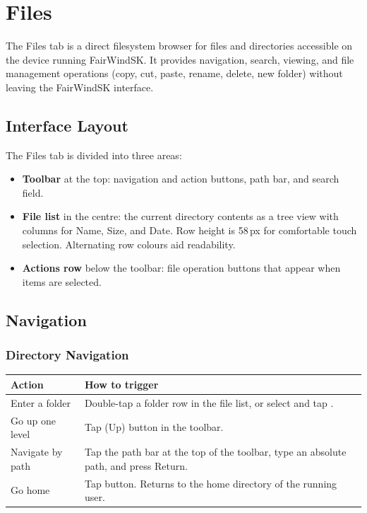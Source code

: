 \chapter{Files}
\label{ch:files}

The Files tab is a direct filesystem browser for files and directories accessible on the device
running FairWindSK.
It provides navigation, search, viewing, and file management operations (copy, cut, paste, rename,
delete, new folder) without leaving the FairWindSK interface.


\section{Interface Layout}

The Files tab is divided into three areas:

\begin{itemize}
  \item \textbf{Toolbar} at the top: navigation and action buttons, path bar, and search field.
  \item \textbf{File list} in the centre: the current directory contents as a tree view with columns for Name, Size, and Date. Row height is 58\,px for comfortable touch selection. Alternating row colours aid readability.
  \item \textbf{Actions row} below the toolbar: file operation buttons that appear when items are selected.
\end{itemize}

\section{Navigation}

\subsection{Directory Navigation}

\begin{longtable}{L{3cm} L{10.7cm}}
\toprule
{}
{\sffamily\bfseries\color{white} Action} &
{\sffamily\bfseries\color{white} How to trigger} \\
\midrule
Enter a folder & Double-tap a folder row in the file list, or select and tap . \\
Go up one level & Tap  (Up) button in the toolbar. \\
Navigate by path & Tap the path bar at the top of the toolbar, type an absolute path, and press Return. \\
Go home & Tap  button. Returns to the home directory of the running user. \\
\bottomrule
\end{longtable}

